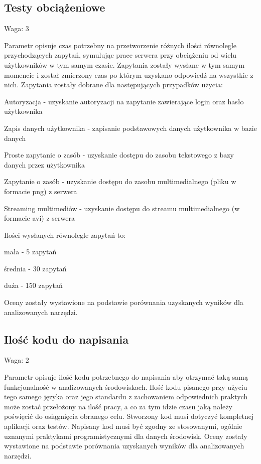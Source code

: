 \documentclass[12pt]{report}
\begin{document}
    \subsection{Testy obciążeniowe}
      \begin{description}
        \item Waga: 3
      \end{description}
      Parametr opisuje czas potrzebny na przetworzenie różnych ilości równolegle przychodzących zapytań, symulując prace serwera przy obciążeniu od wielu użytkowników w tym samym czasie.
      Zapytania zostały wysłane w tym samym momencie i został zmierzony czas po którym uzyskano odpowiedź na wszystkie z nich.
      Zapytania zostały dobrane dla następujących przypadków użycia:
      \begin{description}
        \item Autoryzacja - uzyskanie autoryzacji na zapytanie zawierające login oraz hasło użytkownika
        \item Zapis danych użytkownika - zapisanie podstawowych danych użytkownika w bazie danych
        \item Proste zapytanie o zasób - uzyskanie dostępu do zasobu tekstowego z bazy danych przez użytkownika
        \item Zapytanie o zasób - uzyskanie dostępu do zasobu multimedialnego (pliku w formacie png) z serwera
        \item Streaming multimediów - uzyskanie dostępu do streamu multimedialnego (w formacie avi) z serwera
      \end{description}
      Ilości wysłanych równolegle zapytań to:
      \begin{description}
        \item mała - 5 zapytań
        \item średnia - 30 zapytań
        \item duża - 150 zapytań
      \end{description}
      Oceny zostały wystawione na podstawie porównania uzyskanych wyników dla analizowanych narzędzi.

    \subsection{Ilość kodu do napisania}
      \begin{description}
        \item Waga: 2
      \end{description}
      Parametr opisuje ilość kodu potrzebnego do napisania aby otrzymać taką samą funkcjonalność w analizowanych środowiskach.
      Ilość kodu pisanego przy użyciu tego samego języka oraz jego standardu z zachowaniem odpowiednich praktych może zostać przełożony na ilość pracy, a co za tym idzie czasu jaką należy poświęcić do osiągnięcia obranego celu.
      Stworzony kod musi dotyczyć kompletnej aplikacji oraz testów.
      Napisany kod musi być zgodny ze stosowanymi, ogólnie uznanymi praktykami programistycznymi dla danych środowisk.
      Oceny zostały wystawione na podstawie porównania uzyskanych wyników dla analizowanych narzędzi.
\end{document}
